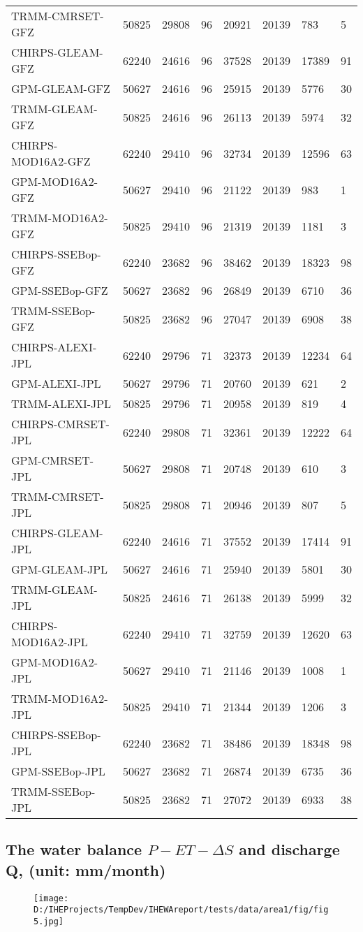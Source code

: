 \documentclass{article}%
\begin{document}
\begin{longtable}{|l|l|l|l|l|l|l|l|}
TRMM-CMRSET-GFZ&50825&29808&96&20921&20139&783&5\\%
CHIRPS-GLEAM-GFZ&62240&24616&96&37528&20139&17389&91\\%
GPM-GLEAM-GFZ&50627&24616&96&25915&20139&5776&30\\%
TRMM-GLEAM-GFZ&50825&24616&96&26113&20139&5974&32\\%
CHIRPS-MOD16A2-GFZ&62240&29410&96&32734&20139&12596&63\\%
GPM-MOD16A2-GFZ&50627&29410&96&21122&20139&983&1\\%
TRMM-MOD16A2-GFZ&50825&29410&96&21319&20139&1181&3\\%
CHIRPS-SSEBop-GFZ&62240&23682&96&38462&20139&18323&98\\%
GPM-SSEBop-GFZ&50627&23682&96&26849&20139&6710&36\\%
TRMM-SSEBop-GFZ&50825&23682&96&27047&20139&6908&38\\%
CHIRPS-ALEXI-JPL&62240&29796&71&32373&20139&12234&64\\%
GPM-ALEXI-JPL&50627&29796&71&20760&20139&621&2\\%
TRMM-ALEXI-JPL&50825&29796&71&20958&20139&819&4\\%
CHIRPS-CMRSET-JPL&62240&29808&71&32361&20139&12222&64\\%
GPM-CMRSET-JPL&50627&29808&71&20748&20139&610&3\\%
TRMM-CMRSET-JPL&50825&29808&71&20946&20139&807&5\\%
CHIRPS-GLEAM-JPL&62240&24616&71&37552&20139&17414&91\\%
GPM-GLEAM-JPL&50627&24616&71&25940&20139&5801&30\\%
TRMM-GLEAM-JPL&50825&24616&71&26138&20139&5999&32\\%
CHIRPS-MOD16A2-JPL&62240&29410&71&32759&20139&12620&63\\%
GPM-MOD16A2-JPL&50627&29410&71&21146&20139&1008&1\\%
TRMM-MOD16A2-JPL&50825&29410&71&21344&20139&1206&3\\%
CHIRPS-SSEBop-JPL&62240&23682&71&38486&20139&18348&98\\%
GPM-SSEBop-JPL&50627&23682&71&26874&20139&6735&36\\%
TRMM-SSEBop-JPL&50825&23682&71&27072&20139&6933&38\\%
\end{longtable}

%
\subsection{The water balance $P-ET-\Delta S$ and discharge Q, (unit: mm/month)}%
\label{subsec:ThewaterbalanceP{-}ET{-}DeltaSanddischargeQ,(unitmm/month)}%


\begin{figure}[H]%
\centering%
\texttt{[image: D:/IHEProjects/TempDev/IHEWAreport/tests/data/area1/fig/fig5.jpg]}%
\label{figure:ann3}%
\end{figure}

%
\cleardoublepage%
\end{document}
